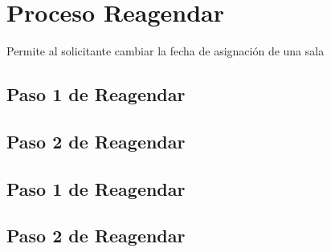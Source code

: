 \chapter{Proceso Reagendar}
	Permite al solicitante cambiar la fecha de asignación de una sala 

\section{Paso 1 de Reagendar}
	
	
\section{Paso 2 de Reagendar}
	
	
\section{Paso 1 de Reagendar}
	
	
\section{Paso 2 de Reagendar}
	
	